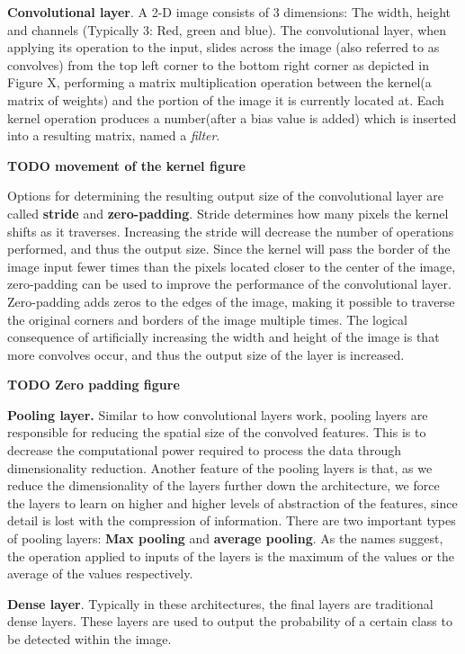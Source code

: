 \documentclass[english, bibtex]{kththesis}
\begin{document}
\textbf{Convolutional layer}. A 2-D image consists of 3 dimensions: The width, height and channels (Typically 3: Red, green and blue). The convolutional layer, when applying its operation to the input, slides across the image (also referred to as convolves) from the top left corner to the bottom right corner as depicted in Figure X, performing a matrix multiplication operation between the kernel(a matrix of weights) and the portion of the image it is currently located at. Each kernel operation produces a number(after a bias value is added) which is inserted into a resulting matrix, named a \textit{filter}.

\textbf{TODO movement of the kernel figure}

Options for determining the resulting output size of the convolutional layer are called \textbf{stride} and \textbf{zero-padding}. Stride determines how many pixels the kernel shifts as it traverses. Increasing the stride will decrease the number of operations performed, and thus the output size. Since the kernel will pass the border of the image input fewer times than the pixels located closer to the center of the image, zero-padding can be used to improve the performance of the convolutional layer. Zero-padding adds zeros to the edges of the image, making it possible to traverse the original corners and borders of the image multiple times. The logical consequence of artificially increasing the width and height of the image is that more convolves occur, and thus the output size of the layer is increased. 

\textbf{TODO Zero padding figure}

\textbf{Pooling layer.} Similar to how convolutional layers work, pooling layers are responsible for reducing the spatial size of the convolved features. This is to decrease the computational power required to process the data through dimensionality reduction. Another feature of the pooling layers is that, as we reduce the dimensionality of the layers further down the architecture, we force the layers to learn on higher and higher levels of abstraction of the features, since detail is lost with the compression of information. There are two important types of pooling layers: \textbf{Max pooling} and \textbf{average pooling}. As the names suggest, the operation applied to inputs of the layers is the maximum of the values or the average of the values respectively. 

\textbf{Dense layer}. Typically in these architectures, the final layers are traditional dense layers. These layers are used to output the probability of a certain class to be detected within the image. 
\end{document}
